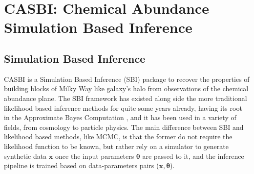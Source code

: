 \chapter{CASBI: Chemical Abundance Simulation Based Inference}

\section{Simulation Based Inference}
CASBI is a Simulation Based Inference (SBI) package to recover the properties of building blocks of Milky Way like galaxy's halo from observations of the chemical abundance plane. The SBI framework has existed along side the more traditional likelihood based inference methods for quite some years already, having its root in the Approximate Bayes Computation \cite{rubinBayesianlyJustifiableRelevant1984}, and it has been used in a variety of fields, from cosmology to particle physics. The main difference between SBI and likelihood based methods, like MCMC, is that the former do not require the likelihood function to be known, but rather rely on a simulator to generate synthetic data \textbf{$\mathbf{x}$} once the input parameters $\boldsymbol{\theta}$ are passed to it, and the inference pipeline is trained based on data-parameters pairs ($\mathbf{x}, \boldsymbol{\theta}$). 

